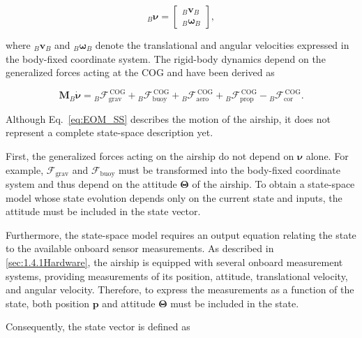\begin{equation}
	{}_B \bm{\nu} =
	\begin{bmatrix}
		{}_B \bm{v}_B \\
		{}_B \bm{\omega}_B
	\end{bmatrix},
\end{equation}

where ${}_B\bm{v}_B$ and ${}_B\bm{\omega}_B$ denote the translational and angular velocities expressed in the body-fixed coordinate system. The rigid-body dynamics depend on the generalized forces acting at the COG and have been derived as

\begin{equation}
	\bm{M} {}_B \dot{\bm{\nu}}
	=
	{}_B \bm{\mathcal{F}}_\mathrm{grav}^\mathrm{\, COG}
	+ {}_B \bm{\mathcal{F}}_\mathrm{buoy}^\mathrm{\, COG}
	+ {}_B \bm{\mathcal{F}}_\mathrm{aero}^\mathrm{\, COG}
	+ {}_B \bm{\mathcal{F}}_\mathrm{prop}^\mathrm{\, COG}
	- {}_B \bm{\mathcal{F}}_\mathrm{cor}^\mathrm{\, COG}.
	\label{eq:EOM_SS}
\end{equation}

Although Eq.~\eqref{eq:EOM_SS} describes the motion of the airship, it does not represent a complete state-space description yet.

First, the generalized forces acting on the airship do not depend on $\bm{\nu}$ alone. For example, $\bm{\mathcal{F}}_\mathrm{grav}$ and $\bm{\mathcal{F}}_\mathrm{buoy}$ must be transformed into the body-fixed coordinate system and thus depend on the attitude $\bm{\Theta}$ of the airship. To obtain a state-space model whose state evolution depends only on the current state and inputs, the attitude must be included in the state vector.

Furthermore, the state-space model requires an output equation relating the state to the available onboard sensor measurements. As described in 
\ref{sec:1.4.1Hardware}, the airship is equipped with several onboard measurement systems, providing measurements of its position, attitude, translational velocity, and angular velocity.
Therefore, to express the measurements as a function of the state, both position $\bm{p}$ and attitude $\bm{\Theta}$ must be included in the state.

Consequently, the state vector is defined as

